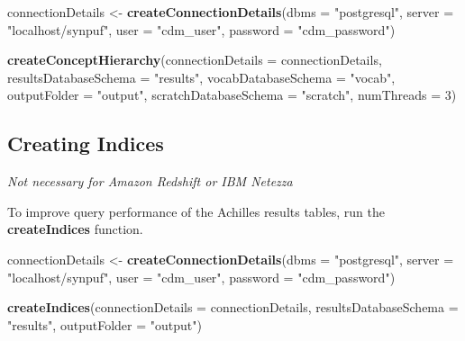 \documentclass[]{article}
\newenvironment{Shaded}{\begin{snugshade}}{\end{snugshade}}
\newcommand{\KeywordTok}[1]{\textcolor[rgb]{0.13,0.29,0.53}{\textbf{#1}}}
\newcommand{\DataTypeTok}[1]{\textcolor[rgb]{0.13,0.29,0.53}{#1}}
\newcommand{\DecValTok}[1]{\textcolor[rgb]{0.00,0.00,0.81}{#1}}
\newcommand{\StringTok}[1]{\textcolor[rgb]{0.31,0.60,0.02}{#1}}
\newcommand{\NormalTok}[1]{#1}
\begin{document}
\begin{Shaded}
\begin{Highlighting}[]
\NormalTok{connectionDetails <-}\StringTok{ }\KeywordTok{createConnectionDetails}\NormalTok{(}\DataTypeTok{dbms =} \StringTok{"postgresql"}\NormalTok{, }
                                             \DataTypeTok{server =} \StringTok{"localhost/synpuf"}\NormalTok{, }
                                             \DataTypeTok{user =} \StringTok{"cdm_user"}\NormalTok{, }
                                             \DataTypeTok{password =} \StringTok{"cdm_password"}\NormalTok{)}

\KeywordTok{createConceptHierarchy}\NormalTok{(}\DataTypeTok{connectionDetails =}\NormalTok{ connectionDetails, }
                       \DataTypeTok{resultsDatabaseSchema =} \StringTok{"results"}\NormalTok{, }
                       \DataTypeTok{vocabDatabaseSchema =} \StringTok{"vocab"}\NormalTok{, }
                       \DataTypeTok{outputFolder =} \StringTok{"output"}\NormalTok{, }
                       \DataTypeTok{scratchDatabaseSchema =} \StringTok{"scratch"}\NormalTok{, }
                       \DataTypeTok{numThreads =} \DecValTok{3}\NormalTok{)}
\end{Highlighting}
\end{Shaded}

\subsection{Creating Indices}\label{creating-indices}

\emph{Not necessary for Amazon Redshift or IBM Netezza}

To improve query performance of the Achilles results tables, run the
\textbf{createIndices} function.

\begin{Shaded}
\begin{Highlighting}[]
\NormalTok{connectionDetails <-}\StringTok{ }\KeywordTok{createConnectionDetails}\NormalTok{(}\DataTypeTok{dbms =} \StringTok{"postgresql"}\NormalTok{, }
                                             \DataTypeTok{server =} \StringTok{"localhost/synpuf"}\NormalTok{, }
                                             \DataTypeTok{user =} \StringTok{"cdm_user"}\NormalTok{, }
                                             \DataTypeTok{password =} \StringTok{"cdm_password"}\NormalTok{)}

\KeywordTok{createIndices}\NormalTok{(}\DataTypeTok{connectionDetails =}\NormalTok{ connectionDetails, }
              \DataTypeTok{resultsDatabaseSchema =} \StringTok{"results"}\NormalTok{, }
              \DataTypeTok{outputFolder =} \StringTok{"output"}\NormalTok{)}
\end{Highlighting}
\end{Shaded}
\end{document}
